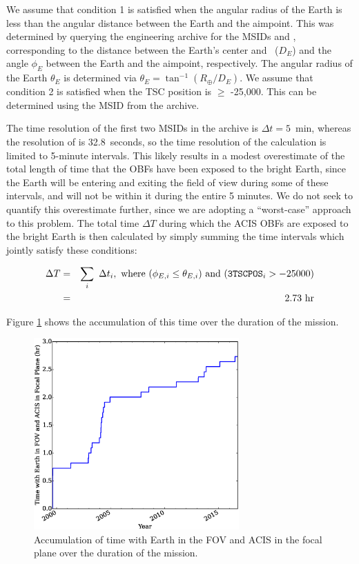 \documentclass[11pt]{article}
\begin{document}
We assume that condition 1 is satisfied when the angular radius of the Earth is less than the
angular distance between the Earth and the aimpoint. This was determined by querying
the  engineering archive for the MSIDs  and ,
corresponding to the distance between the Earth's center and \chandra~($D_E$) and the angle $\phi_E$ between
the Earth and the aimpoint, respectively. The angular radius of the Earth $\theta_E$ is determined
via $\theta_E = \tan^{-1} (R_\oplus/D_E)$. We assume that condition 2 is satisfied when the TSC
position is $\geq$ -25,000. This can be determined using the MSID  from the 
archive.

The time resolution of the first two MSIDs in the archive is $\Delta{t} = 5$~min, whereas the resolution
of  is 32.8~seconds, so the time resolution of the calculation is limited to 5-minute intervals.
This likely results in a modest overestimate of the total length of time that the OBFs have been exposed to
the bright Earth, since the Earth will be entering and exiting the field of view during some of these intervals,
and will not be within it during the entire 5 minutes. We do not seek to quantify this overestimate further, since we are adopting a ``worst-case'' approach to this problem. The total time $\Delta{T}$ during which the ACIS OBFs are exposed to the bright Earth is then calculated by simply summing the time intervals which jointly satisfy these conditions:

\begin{eqnarray}
\Delta{T} &=& \displaystyle\sum_i~\Delta{t_i},~{\rm where}~(\phi_{E,i} \leq \theta_{E,i})~{\rm and}~(\texttt{3TSCPOS}_i > -25000) \\
\nonumber &=& 2.73~{\rm hr}
\end{eqnarray}

\noindent
Figure \ref{fig:time_accum} shows the accumulation of this time over the duration of the mission.

\begin{figure}
\begin{center}
\includegraphics[width=0.7\textwidth]{time_accum.eps}
\caption{Accumulation of time with Earth in the FOV and ACIS in the focal plane over the duration of the mission.\label{fig:time_accum}}
\end{center}
\end{figure}
\end{document}
